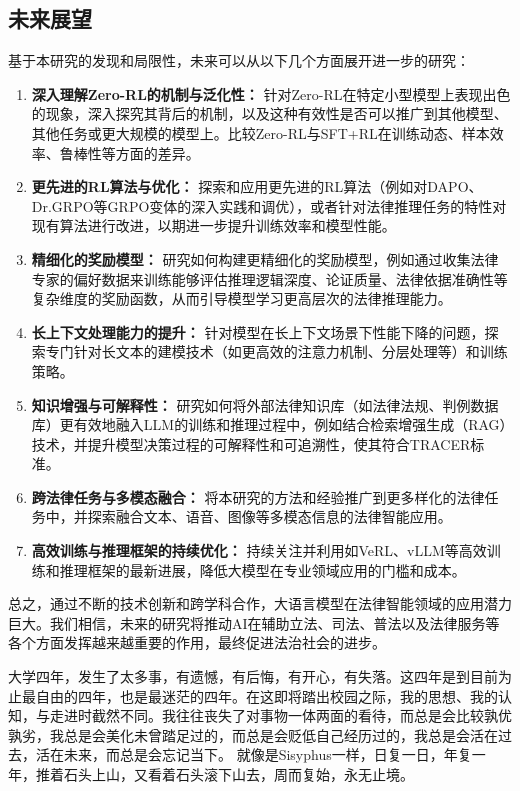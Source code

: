 \documentclass{pkuthesis}
\begin{document}
\subsection{未来展望}
基于本研究的发现和局限性，未来可以从以下几个方面展开进一步的研究：
\begin{enumerate}
    \item \textbf{深入理解Zero-RL的机制与泛化性：} 针对Zero-RL在特定小型模型上表现出色的现象，深入探究其背后的机制，以及这种有效性是否可以推广到其他模型、其他任务或更大规模的模型上。比较Zero-RL与SFT+RL在训练动态、样本效率、鲁棒性等方面的差异。
    \item \textbf{更先进的RL算法与优化：} 探索和应用更先进的RL算法（例如对DAPO、Dr.GRPO等GRPO变体的深入实践和调优），或者针对法律推理任务的特性对现有算法进行改进，以期进一步提升训练效率和模型性能。
    \item \textbf{精细化的奖励模型：} 研究如何构建更精细化的奖励模型，例如通过收集法律专家的偏好数据来训练能够评估推理逻辑深度、论证质量、法律依据准确性等复杂维度的奖励函数，从而引导模型学习更高层次的法律推理能力。
    \item \textbf{长上下文处理能力的提升：} 针对模型在长上下文场景下性能下降的问题，探索专门针对长文本的建模技术（如更高效的注意力机制、分层处理等）和训练策略。
    \item \textbf{知识增强与可解释性：} 研究如何将外部法律知识库（如法律法规、判例数据库）更有效地融入LLM的训练和推理过程中，例如结合检索增强生成（RAG）技术，并提升模型决策过程的可解释性和可追溯性，使其符合TRACER标准。
    \item \textbf{跨法律任务与多模态融合：} 将本研究的方法和经验推广到更多样化的法律任务中，并探索融合文本、语音、图像等多模态信息的法律智能应用。
    \item \textbf{高效训练与推理框架的持续优化：} 持续关注并利用如VeRL、vLLM等高效训练和推理框架的最新进展，降低大模型在专业领域应用的门槛和成本。
\end{enumerate}
总之，通过不断的技术创新和跨学科合作，大语言模型在法律智能领域的应用潜力巨大。我们相信，未来的研究将推动AI在辅助立法、司法、普法以及法律服务等各个方面发挥越来越重要的作用，最终促进法治社会的进步。

\printbibliography

\Acknowledgments

大学四年，发生了太多事，有遗憾，有后悔，有开心，有失落。这四年是到目前为止最自由的四年，也是最迷茫的四年。在这即将踏出校园之际，我的思想、我的认知，与走进时截然不同。我往往丧失了对事物一体两面的看待，而总是会比较孰优孰劣，我总是会美化未曾踏足过的，而总是会贬低自己经历过的，我总是会活在过去，活在未来，而总是会忘记当下。
就像是Sisyphus一样，日复一日，年复一年，推着石头上山，又看着石头滚下山去，周而复始，永无止境。
\end{document}
